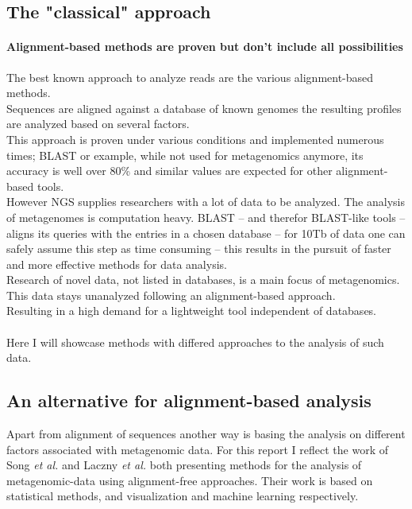 \documentclass[twocolumn]{bmcart}%
\begin{document}
\subsection*{The "classical" approach}
\paragraph*{Alignment-based methods are proven but don't include all possibilities}
The best known approach to analyze reads are the various alignment-based methods.\\
Sequences are aligned against a database of known genomes the resulting profiles are analyzed based on several factors.\\
This approach is proven under various conditions and implemented numerous times; BLAST or example, while not used for metagenomics anymore, its accuracy is well over 80\%\cite{doi:10.1142/9789814295291_0003} and similar values are expected for other alignment-based tools.\\
However NGS supplies researchers with a lot of data to be analyzed. The analysis of metagenomes is computation heavy. BLAST -- and therefor BLAST-like tools -- aligns its queries with the entries in a chosen database -- for 10Tb of data one can safely assume this step as time consuming -- this results in the pursuit of faster and more effective methods for data analysis.\\
Research of  novel data, not listed in databases, is a main focus of metagenomics. This data stays unanalyzed following an alignment-based approach. \\
Resulting in a high demand for a lightweight tool independent of databases.
\paragraph*{}
Here I will showcase methods with differed approaches to the analysis of such data. 
\subsection*{An alternative for alignment-based analysis}
Apart from alignment of sequences another way is basing the analysis on different factors associated with metagenomic data. For this report I reflect the work of Song \textit{et al.} \cite{doi:10.1093/bib/bbt067} and Laczny \textit{et al.} \cite{Laczny2014} both presenting methods for the analysis of metagenomic-data using alignment-free approaches. Their work is based on statistical methods, and visualization and machine learning respectively.
\end{document}
